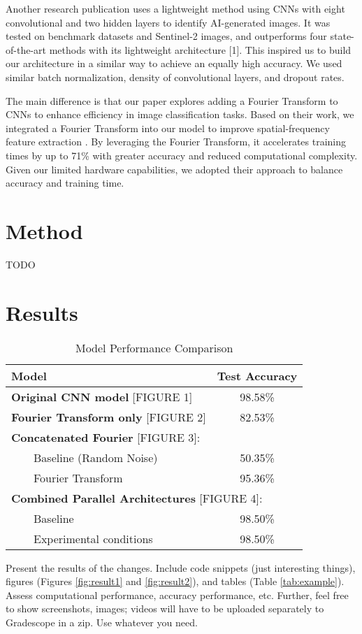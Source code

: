 Another research publication uses a lightweight method using CNNs with eight convolutional and two hidden layers to identify AI-generated images. It was tested on benchmark datasets and Sentinel-2 images, and outperforms four state-of-the-art methods with its lightweight architecture [1]. This inspired us to build our architecture in a similar way to achieve an equally high accuracy. We used similar batch normalization, density of convolutional layers, and dropout rates. 

The main difference is that our paper explores adding a Fourier Transform to CNNs to enhance efficiency in image classification tasks. Based on their work, we integrated a Fourier Transform into our model to improve spatial-frequency feature extraction \cite{4}. By leveraging the Fourier Transform, it accelerates training times by up to 71\% with greater accuracy and reduced computational complexity. Given our limited hardware capabilities, we adopted their approach to balance accuracy and training time.



\section{Method}

TODO


\section{Results}

\begin{table}[h]
    \centering
    \begin{tabular}{|l|c|}
    \hline
    \textbf{Model} & \textbf{Test Accuracy} \\
    \hline
    \textbf{Original CNN model} [FIGURE 1] & 98.58\% \\
    \hline
    \textbf{Fourier Transform only} [FIGURE 2] & 82.53\% \\
    \hline
    \multicolumn{2}{|l|}{\textbf{Concatenated Fourier} [FIGURE 3]:} \\
    \hline
    ~~~~Baseline (Random Noise) & 50.35\% \\
    ~~~~Fourier Transform & 95.36\% \\
    \hline
    \multicolumn{2}{|l|}{\textbf{Combined Parallel Architectures} [FIGURE 4]:} \\
    \hline
    ~~~~Baseline & 98.50\% \\
    ~~~~Experimental conditions & 98.50\% \\
    \hline
    \end{tabular}
    \caption{Model Performance Comparison}
    \label{tab:model-comparison}
\end{table}
Present the results of the changes. Include code snippets (just interesting things), figures (Figures \ref{fig:result1} and \ref{fig:result2}), and tables (Table \ref{tab:example}). Assess computational performance, accuracy performance, etc. Further, feel free to show screenshots, images; videos will have to be uploaded separately to Gradescope in a zip. Use whatever you need.




